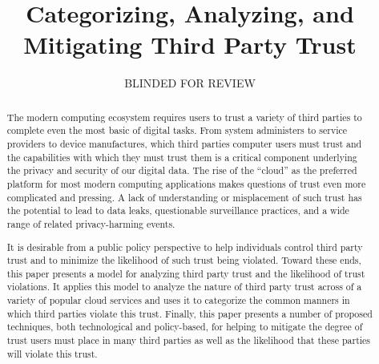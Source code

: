 \documentclass[11pt,letterpaper]{article}
\begin{document}
\title{Categorizing, Analyzing, and Mitigating Third Party Trust}

\author{BLINDED FOR REVIEW}

\date{}

\maketitle

\begin{abstract}

The modern computing ecosystem requires users to trust a variety of
third parties to complete even the most basic of digital tasks.  From
system administers to service providers to device manufactures, which
third parties computer users must trust and the capabilities with
which they must trust them is a critical component underlying the
privacy and security of our digital data. The rise of the ``cloud'' as
the preferred platform for most modern computing applications makes
questions of trust even more complicated and pressing. A lack of
understanding or misplacement of such trust has the potential to lead
to data leaks, questionable surveillance practices, and a wide range
of related privacy-harming events.

It is desirable from a public policy perspective to help individuals
control third party trust and to minimize the likelihood of such trust
being violated.  Toward these ends, this paper presents a model for
analyzing third party trust and the likelihood of trust violations. It
applies this model to analyze the nature of third party trust across
of a variety of popular cloud services and uses it to categorize the
common manners in which third parties violate this trust. Finally,
this paper presents a number of proposed techniques, both
technological and policy-based, for helping to mitigate the degree of
trust users must place in many third parties as well as the likelihood
that these parties will violate this trust.

\end{abstract}









\end{document}
